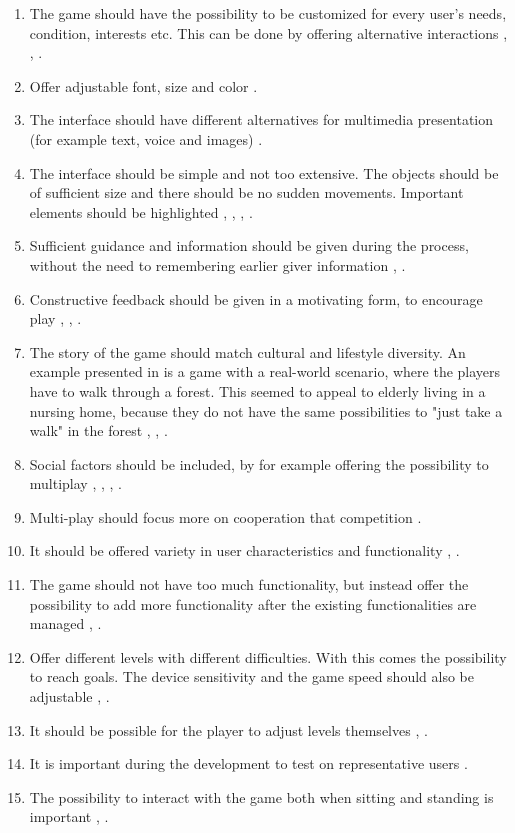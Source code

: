 \begin{enumerate}[{G}.1]
\renewcommand{\labelitemi}{$\bullet$}
\item The game should have the possibility to be customized for every user's needs, condition, interests etc. This can be done by offering alternative interactions \cite{Billis}, \cite{gregor}, \cite{gerling1}.
\item Offer adjustable font, size and color \cite{Billis}.
\item The interface should have different alternatives for multimedia presentation (for example text, voice and images) \cite{Billis}.
\item The interface should be simple and not too extensive. The objects should be of sufficient size and there should be no sudden movements. Important elements should be highlighted \cite{Billis}, \cite{gerling1}, \cite{gerling2}, \cite{exergamesforelderly}.
\item Sufficient guidance and information should be given during the process, without the need to remembering earlier giver information \cite{Billis}, \cite{gregor}.
\item Constructive feedback should be given in a motivating form, to encourage play \cite{Billis}, \cite{gerling1}, \cite{exergamesforelderly}.
\item The story of the game should match cultural and lifestyle diversity. An example presented in \cite{gerling2} is a game with a real-world scenario, where the players have to walk through a forest. This seemed to appeal to elderly living in a nursing home, because they do not have the same possibilities to "just take a walk" in the forest \cite{Billis}, \cite{gregor}, \cite{gerling2}. 
\item Social factors should be included, by for example offering the possibility to multiplay \cite{Billis}, \cite{gerling2}, \cite{gerling1}, \cite{exergamesforelderly}.
\item Multi-play should focus more on cooperation that competition \cite{Gajadhar}.
\item It should be offered variety in user characteristics and functionality \cite{gregor}, \cite{gerling1}.
\item The game should not have too much functionality, but instead offer the possibility to add more functionality after the existing functionalities are managed \cite{gregor}, \cite{gerling2}.
\item Offer different levels with different difficulties. With this comes the possibility to reach goals. The device sensitivity and the game speed should also be adjustable \cite{gregor}, \cite{gerling1}.
\item It should be possible for the player to adjust levels themselves \cite{gregor}, \cite{gerling1}. 
\item It is important during the development to test on representative users \cite{gregor}.
\item The possibility to interact with the game both when sitting and standing is important \cite{gerling1}, \cite{gerling2}.
\end{enumerate}

